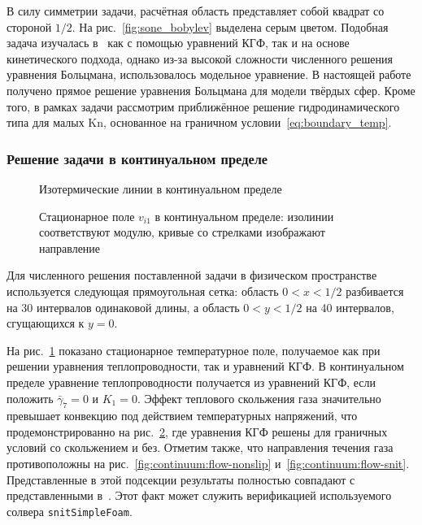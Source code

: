 \documentclass[
aps,%
12pt,%
final,%
notitlepage,%
oneside,%
onecolumn,%
nobibnotes,%
nofootinbib,%
superscriptaddress,%
noshowpacs,%
showkeys,%
centertags]%
{revtex4}
\newcommand{\Kn}{\mathrm{Kn}}
\begin{document}
В силу симметрии задачи, расчётная область представляет собой квадрат со стороной \(1/2\).
На рис.~\ref{fig:sone_bobylev} выделена серым цветом.
Подобная задача изучалась в~\cite{Sone1996} как с помощью уравнений КГФ, так и на основе кинетического подхода,
однако из-за высокой сложности численного решения уравнения Больцмана, использовалось модельное уравнение.
В настоящей работе получено прямое решение уравнения Больцмана для модели твёрдых сфер.
Кроме того, в рамках задачи рассмотрим приближённое решение гидродинамического типа для малых \(\Kn\),
основанное на граничном условии~\eqref{eq:boundary_temp}.

\subsubsection{Решение задачи в континуальном пределе}

\begin{figure}
    \caption{Изотермические линии в континуальном пределе}
    \label{fig:continuum:temp}
\end{figure}

\begin{figure}
    \centering
    \caption{Стационарное поле \(v_{i1}\) в континуальном пределе:
        изолинии соответствуют модулю, кривые со стрелками изображают направление}
    \label{fig:continuum:flow}
\end{figure}

Для численного решения поставленной задачи в физическом пространстве
используется следующая прямоугольная сетка:
область \(0<x<1/2\) разбивается на 30 интервалов одинаковой длины,
а область \(0<y<1/2\) на 40 интервалов, сгущающихся к \(y=0\).

На рис.~\ref{fig:continuum:temp} показано стационарное температурное поле,
получаемое как при решении уравнения теплопроводности, так и уравнений КГФ.
В континуальном пределе уравнение теплопроводности получается из уравнений КГФ,
если положить \(\bar{\gamma}_7=0\) и \(K_1=0\).
Эффект теплового скольжения газа значительно превышает конвекцию под действием температурных напряжений,
что продемонстрированно на рис.~\ref{fig:continuum:flow}, где уравнения КГФ решены
для граничных условий со скольжением и без.
Отметим также, что направления течения газа противоположны на рис.~\ref{fig:continuum:flow-nonslip}
и~\ref{fig:continuum:flow-snit}.
Представленные в этой подсекции результаты полностью совпадают с представленными в~\cite{Sone1996}.
Этот факт может служить верификацией используемого солвера \verb+snitSimpleFoam+.
\end{document}
